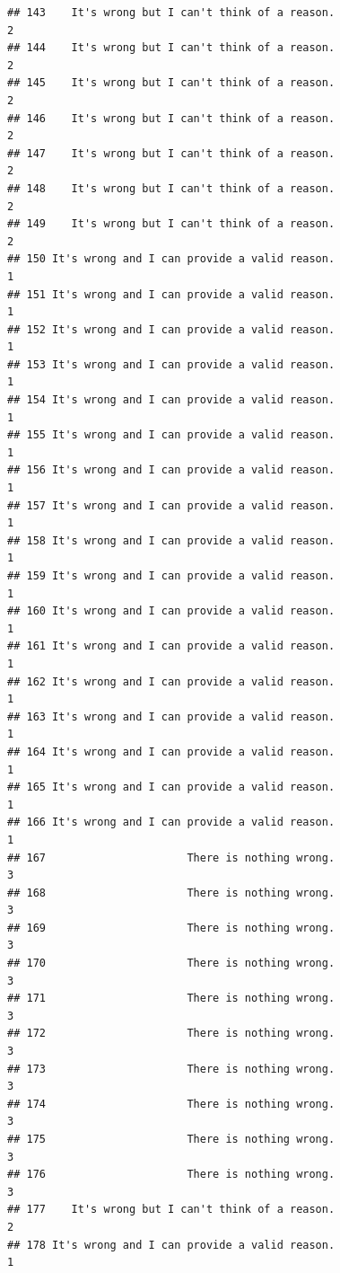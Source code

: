 \documentclass[
  american,
  man,floatsintext]{apa7}
\begin{document}
\begin{verbatim}
## 143    It's wrong but I can't think of a reason.                    2
## 144    It's wrong but I can't think of a reason.                    2
## 145    It's wrong but I can't think of a reason.                    2
## 146    It's wrong but I can't think of a reason.                    2
## 147    It's wrong but I can't think of a reason.                    2
## 148    It's wrong but I can't think of a reason.                    2
## 149    It's wrong but I can't think of a reason.                    2
## 150 It's wrong and I can provide a valid reason.                    1
## 151 It's wrong and I can provide a valid reason.                    1
## 152 It's wrong and I can provide a valid reason.                    1
## 153 It's wrong and I can provide a valid reason.                    1
## 154 It's wrong and I can provide a valid reason.                    1
## 155 It's wrong and I can provide a valid reason.                    1
## 156 It's wrong and I can provide a valid reason.                    1
## 157 It's wrong and I can provide a valid reason.                    1
## 158 It's wrong and I can provide a valid reason.                    1
## 159 It's wrong and I can provide a valid reason.                    1
## 160 It's wrong and I can provide a valid reason.                    1
## 161 It's wrong and I can provide a valid reason.                    1
## 162 It's wrong and I can provide a valid reason.                    1
## 163 It's wrong and I can provide a valid reason.                    1
## 164 It's wrong and I can provide a valid reason.                    1
## 165 It's wrong and I can provide a valid reason.                    1
## 166 It's wrong and I can provide a valid reason.                    1
## 167                      There is nothing wrong.                    3
## 168                      There is nothing wrong.                    3
## 169                      There is nothing wrong.                    3
## 170                      There is nothing wrong.                    3
## 171                      There is nothing wrong.                    3
## 172                      There is nothing wrong.                    3
## 173                      There is nothing wrong.                    3
## 174                      There is nothing wrong.                    3
## 175                      There is nothing wrong.                    3
## 176                      There is nothing wrong.                    3
## 177    It's wrong but I can't think of a reason.                    2
## 178 It's wrong and I can provide a valid reason.                    1

\end{verbatim}
\end{document}
